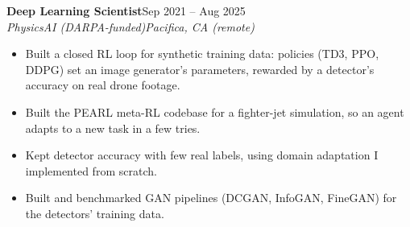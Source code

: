 \documentclass[10pt]{article}
\newcommand{\role}[4]{\par\vspace{5pt}\textbf{#1}\hfill#2\\\textit{#3}\hfill\textit{#4}\par}
\begin{document}
\begin{itemize}
\end{itemize}

\role{Deep Learning Scientist}{Sep 2021 -- Aug 2025}{PhysicsAI (DARPA-funded)}{Pacifica, CA (remote)}
\begin{itemize}
\item Built a closed RL loop for synthetic training data: policies (TD3, PPO, DDPG) set an image generator's parameters, rewarded by a detector's accuracy on real drone footage.
\item Built the PEARL meta-RL codebase for a fighter-jet simulation, so an agent adapts to a new task in a few tries.
\item Kept detector accuracy with few real labels, using domain adaptation I implemented from scratch.
\item Built and benchmarked GAN pipelines (DCGAN, InfoGAN, FineGAN) for the detectors' training data.
\end{itemize}
\end{document}
